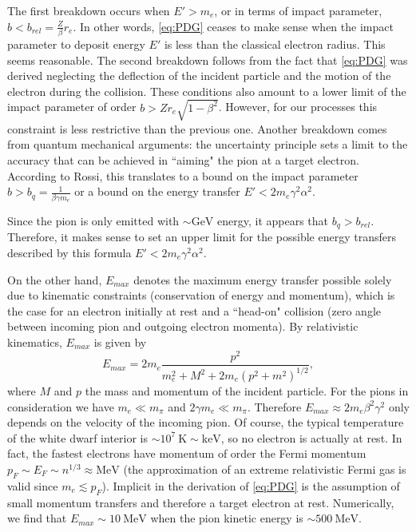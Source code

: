 \documentclass[11 pt, preprint,preprintnumbers,amsmath,amssymb, prd]{revtex4}
\begin{document}
The first breakdown occurs when $E' > m_e$, or in terms of impact parameter, $b< b_{rel} = \frac{Z}{\beta} r_e$. In other words, \ref{eq:PDG} ceases to make sense when the impact parameter to deposit energy $E'$ is less than the classical electron radius. This seems reasonable. The second breakdown follows from the fact that \ref{eq:PDG} was derived neglecting the deflection of the incident particle and the motion of the electron during the collision. These conditions also amount to a lower limit of the impact parameter of order $b > Z r_e \sqrt{1-\beta^2}$. However, for our processes this constraint is less restrictive than the previous one. Another breakdown comes from quantum mechanical arguments: the uncertainty principle sets a limit to the accuracy that can be achieved in ``aiming" the pion at a target electron. According to Rossi, this translates to a bound on the impact parameter $b > b_q = \frac{1}{\beta \gamma m_e}$ or a bound on the energy transfer $E' < 2 m_e \gamma^2 \alpha^2$. 

Since the pion is only emitted with $\sim \text{GeV}$ energy, it appears that $b_q > b_{rel}$. Therefore, it makes sense to set an upper limit for the possible energy transfers described by this formula $E' < 2 m_e \gamma^2 \alpha^2$. 

On the other hand, $E_{max}$ denotes the maximum energy transfer possible solely due to kinematic constraints (conservation of energy and momentum), which is the case for an electron initially at rest and a ``head-on" collision (zero angle between incoming pion and outgoing electron momenta). By relativistic kinematics, $E_{max}$ is given by 
\begin{equation}
E_{max} = 2 m_e \frac{p^2}{m_e^2 + M^2 + 2m_e (p^2 +m^2)^{1/2}},
\end{equation}
where $M$ and $p$ the mass and momentum of the incident particle. For the pions in consideration we have $m_e \ll m_\pi$ and $2 \gamma m_e \ll m_\pi$. Therefore $E_{max} \approx 2 m_e \beta^2 \gamma^2$ only depends on the velocity of the incoming pion. Of course, the typical temperature of the white dwarf interior is $\sim 10^{7} ~\text{K} \sim \text{keV}$, so no electron is actually at rest. In fact, the fastest electrons have momentum of order the Fermi momentum $p_F \sim E_F \sim n^{1/3} \approx \text{MeV}$ (the approximation of an extreme relativistic Fermi gas is valid since $m_e \lesssim p_F$). Implicit in the derivation of \ref{eq:PDG} is the assumption of small momentum transfers and therefore a target electron at rest. Numerically, we find that $E_{max} \sim 10 ~\text{MeV}$ when the pion kinetic energy is $\sim 500 ~\text{MeV}$. 
\end{document}
